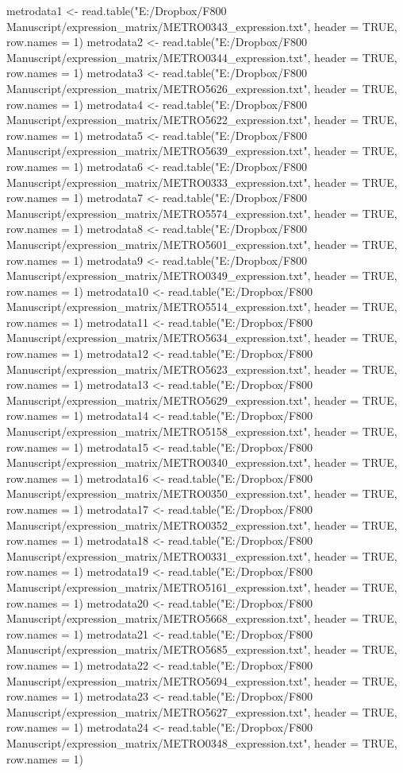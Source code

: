 \documentclass[10pt]{article}
\begin{document}
metrodata1 <- read.table("E:/Dropbox/F800 Manuscript/expression_matrix/METRO0343_expression.txt", header = TRUE, row.names = 1)  
metrodata2 <- read.table("E:/Dropbox/F800 Manuscript/expression_matrix/METRO0344_expression.txt", header = TRUE, row.names = 1)  
metrodata3 <- read.table("E:/Dropbox/F800 Manuscript/expression_matrix/METRO5626_expression.txt", header = TRUE, row.names = 1)
metrodata4 <- read.table("E:/Dropbox/F800 Manuscript/expression_matrix/METRO5622_expression.txt", header = TRUE, row.names = 1)
metrodata5 <- read.table("E:/Dropbox/F800 Manuscript/expression_matrix/METRO5639_expression.txt", header = TRUE, row.names = 1)
metrodata6 <- read.table("E:/Dropbox/F800 Manuscript/expression_matrix/METRO0333_expression.txt", header = TRUE, row.names = 1)
metrodata7 <- read.table("E:/Dropbox/F800 Manuscript/expression_matrix/METRO5574_expression.txt", header = TRUE, row.names = 1)
metrodata8 <- read.table("E:/Dropbox/F800 Manuscript/expression_matrix/METRO5601_expression.txt", header = TRUE, row.names = 1)
metrodata9 <- read.table("E:/Dropbox/F800 Manuscript/expression_matrix/METRO0349_expression.txt", header = TRUE, row.names = 1)
metrodata10 <- read.table("E:/Dropbox/F800 Manuscript/expression_matrix/METRO5514_expression.txt", header = TRUE, row.names = 1)
metrodata11 <- read.table("E:/Dropbox/F800 Manuscript/expression_matrix/METRO5634_expression.txt", header = TRUE, row.names = 1)
metrodata12 <- read.table("E:/Dropbox/F800 Manuscript/expression_matrix/METRO5623_expression.txt", header = TRUE, row.names = 1)
metrodata13 <- read.table("E:/Dropbox/F800 Manuscript/expression_matrix/METRO5629_expression.txt", header = TRUE, row.names = 1)
metrodata14 <- read.table("E:/Dropbox/F800 Manuscript/expression_matrix/METRO5158_expression.txt", header = TRUE, row.names = 1)
metrodata15 <- read.table("E:/Dropbox/F800 Manuscript/expression_matrix/METRO0340_expression.txt", header = TRUE, row.names = 1)
metrodata16 <- read.table("E:/Dropbox/F800 Manuscript/expression_matrix/METRO0350_expression.txt", header = TRUE, row.names = 1)
metrodata17 <- read.table("E:/Dropbox/F800 Manuscript/expression_matrix/METRO0352_expression.txt", header = TRUE, row.names = 1)
metrodata18 <- read.table("E:/Dropbox/F800 Manuscript/expression_matrix/METRO0331_expression.txt", header = TRUE, row.names = 1)
metrodata19 <- read.table("E:/Dropbox/F800 Manuscript/expression_matrix/METRO5161_expression.txt", header = TRUE, row.names = 1)
metrodata20 <- read.table("E:/Dropbox/F800 Manuscript/expression_matrix/METRO5668_expression.txt", header = TRUE, row.names = 1)
metrodata21 <- read.table("E:/Dropbox/F800 Manuscript/expression_matrix/METRO5685_expression.txt", header = TRUE, row.names = 1)
metrodata22 <- read.table("E:/Dropbox/F800 Manuscript/expression_matrix/METRO5694_expression.txt", header = TRUE, row.names = 1)
metrodata23 <- read.table("E:/Dropbox/F800 Manuscript/expression_matrix/METRO5627_expression.txt", header = TRUE, row.names = 1)
metrodata24 <- read.table("E:/Dropbox/F800 Manuscript/expression_matrix/METRO0348_expression.txt", header = TRUE, row.names = 1)
\end{document}
